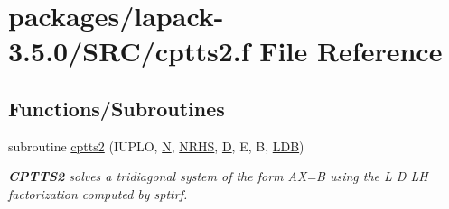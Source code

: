 \hypertarget{cptts2_8f}{}\section{packages/lapack-\/3.5.0/\+S\+R\+C/cptts2.f File Reference}
\label{cptts2_8f}
\subsection*{Functions/\+Subroutines}
\begin{DoxyCompactItemize}
\item 
subroutine \hyperlink{group__complexPTcomputational_gadecb0ce69b03e2b960effe0754e322d4}{cptts2} (I\+U\+P\+L\+O, \hyperlink{polmisc_8c_a0240ac851181b84ac374872dc5434ee4}{N}, \hyperlink{example__user_8c_aa0138da002ce2a90360df2f521eb3198}{N\+R\+H\+S}, \hyperlink{odrpack_8h_a7dae6ea403d00f3687f24a874e67d139}{D}, E, B, \hyperlink{example__user_8c_a50e90a7104df172b5a89a06c47fcca04}{L\+D\+B})
\begin{DoxyCompactList}\small\item\em {\bfseries C\+P\+T\+T\+S2} solves a tridiagonal system of the form A\+X=B using the L D L\+H factorization computed by spttrf. \end{DoxyCompactList}\end{DoxyCompactItemize}
